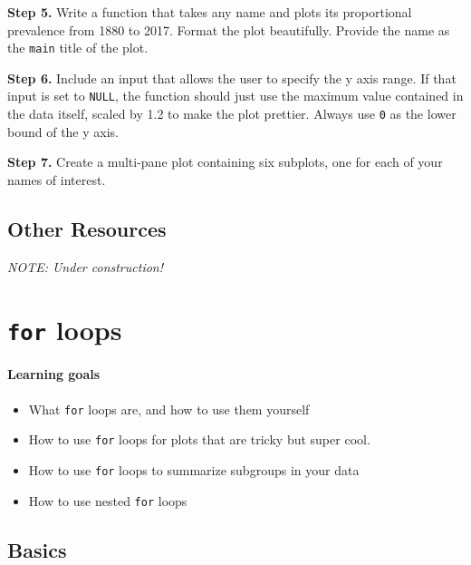 \documentclass[
]{book}
\providecommand{\tightlist}{%
  \setlength{\itemsep}{0pt}\setlength{\parskip}{0pt}}
\begin{document}
\textbf{Step 5.} Write a function that takes any name and plots its proportional prevalence from 1880 to 2017. Format the plot beautifully. Provide the name as the \texttt{main} title of the plot.

\textbf{Step 6.} Include an input that allows the user to specify the y axis range. If that input is set to \texttt{NULL}, the function should just use the maximum value contained in the data itself, scaled by 1.2 to make the plot prettier. Always use \texttt{0} as the lower bound of the y axis.

\textbf{Step 7.} Create a multi-pane plot containing six subplots, one for each of your names of interest.

\hypertarget{other-resources-6}{%
\section*{Other Resources}\label{other-resources-6}}

\emph{NOTE: Under construction!}

\hypertarget{for-loops}{%
\chapter{\texorpdfstring{\texttt{for} loops}{for loops}}\label{for-loops}}

\hypertarget{learning-goals-14}{%
\subsubsection*{Learning goals}\label{learning-goals-14}}

\begin{itemize}
\tightlist
\item
  What \texttt{for} loops are, and how to use them yourself
\item
  How to use \texttt{for} loops for plots that are tricky but super cool.
\item
  How to use \texttt{for} loops to summarize subgroups in your data
\item
  How to use nested \texttt{for} loops
\end{itemize}

\hypertarget{basics}{%
\section*{Basics}\label{basics}}
\end{document}
